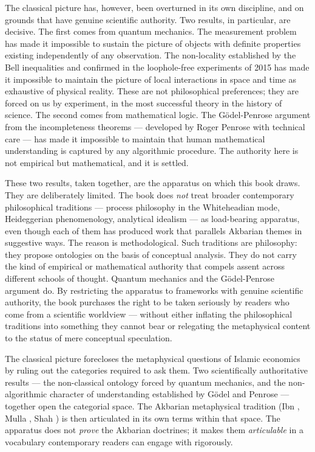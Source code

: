 The classical picture has, however, been overturned in its own
discipline, and on grounds that have genuine scientific authority. Two
results, in particular, are decisive. The first comes from quantum
mechanics. The measurement problem has made it impossible to sustain
the picture of objects with definite properties existing independently
of any observation. The non-locality established by the Bell
inequalities and confirmed in the loophole-free experiments of 2015 has
made it impossible to maintain the picture of local interactions in
space and time as exhaustive of physical reality. These are not
philosophical preferences; they are forced on us by experiment, in
the most successful theory in the history of science. The second
comes from mathematical logic. The G\"odel-Penrose argument from the
incompleteness theorems --- developed by Roger Penrose with technical
care --- has made it impossible to maintain that human mathematical
understanding is captured by any algorithmic procedure. The authority
here is not empirical but mathematical, and it is settled.

These two results, taken together, are the apparatus on which this
book draws. They are deliberately limited. The book does \emph{not}
treat broader contemporary philosophical traditions --- process
philosophy in the Whiteheadian mode, Heideggerian phenomenology,
analytical idealism --- as load-bearing apparatus, even though each of
them has produced work that parallels Akbarian themes in suggestive
ways. The reason is methodological. Such traditions are philosophy:
they propose ontologies on the basis of conceptual analysis. They do
not carry the kind of empirical or mathematical authority that compels
assent across different schools of thought. Quantum mechanics and the
G\"odel-Penrose argument do. By restricting the apparatus to
frameworks with genuine scientific authority, the book purchases the
right to be taken seriously by readers who come from a scientific
worldview --- without either inflating the philosophical traditions
into something they cannot bear or relegating the metaphysical content
to the status of mere conceptual speculation.

\begin{contrastbox}
The classical picture forecloses the metaphysical questions of Islamic
economics by ruling out the categories required to ask them. Two
scientifically authoritative results --- the non-classical ontology
forced by quantum mechanics, and the non-algorithmic character of
understanding established by G\"odel and Penrose --- together open the
categorial space. The Akbarian metaphysical tradition (Ibn
, Mulla , Shah ) is then
articulated in its own terms within that space. The apparatus does
not \emph{prove} the Akbarian doctrines; it makes them
\emph{articulable} in a vocabulary contemporary readers can engage
with rigorously.
\end{contrastbox}

